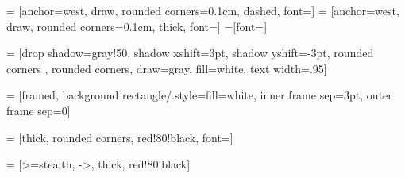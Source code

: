 \newcommand{\configTikzFlowcharts}{
    \tikzset{%
        >={Latex[width=2mm,length=2mm]},
        node distance=1.5cm,
        base/.style = {fill=white, draw=black,
            text width=2.5cm, text centered, font=\sffamily},
        onchain/.style = {base, rectangle, rounded corners},
        offchain/.style = {onchain, dashed},
        terminal/.style = {base, text width=3cm, ellipse},
        i-o/.style = {base, trapezium, trapezium left angle=60, trapezium right angle=120},
        i2o/.style = {i-o, text width=5cm},
        decision/.style = {base, diamond},
        erase/.style = {fill=white, shape=circle, minimum size=1.8*\radius, inner sep=0pt},
    }
}

 = [anchor=west, draw, rounded corners=0.1cm, dashed, font=\scriptsize]
 = [anchor=west, draw, rounded corners=0.1cm, thick, font=\scriptsize]
=[font=\scriptsize]

 = [drop shadow={gray!50, shadow xshift=3pt, shadow yshift=-3pt, rounded corners }, rounded corners, draw=gray, fill=white, text width=.95\linewidth]

 = [framed, background rectangle/.style={fill=white}, inner frame sep=3pt, outer frame sep=0]

 = [thick, rounded corners, red!80!black, font=\footnotesize]

 = [>=stealth, ->, thick, red!80!black]

\newcommand{\umlblock}[4][3cm]{%
    \renewcommand{\arraystretch}{1}%
    \frame{%
        \begin{minipage}[t][#1]{\ifdim#4=0cm 4.5cm \else #4 \fi}
            {\centering
            \vspace{4pt}
            \makebox[1.1\width][c]{#2}\vspace{3pt}
            \hrule}
            \vspace{3pt}
            \begin{tabular}{l}
                #3
            \end{tabular}
        \end{minipage}%
    }%
}

